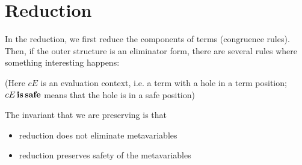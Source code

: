\documentclass[acmsmall,natbib=false,review,anonymous]{acmart}
\begin{document}
    \ottdefnWfInertLabeled{}
\newpage

\section{Reduction}
  
  In the reduction, we first reduce the
  components of terms (congruence rules).
  Then, if the outer structure is an eliminator form,
  there are several rules where something interesting happens:
  \begin{ottdefnblock}[#2]{\ottdefnHeaderRedRed}{}
    \ottusedrule{\ottdruleRedRedAppLamLabeled[#1]{}}
    \ottusedrule{\ottdruleRedRedAppPLamLabeled[#1]{}}
    \ottusedrule{\ottdruleRedRedLRedSafeLabeled[#1]{}}
    \ottusedrule{\ottdruleRedRedLRedNeutLabeled[#1]{}}
    \ottusedrule{\ottdruleRedRedLRedGrLabeled[#1]{}}
    \ottusedrule{\ottdruleRedRedLNotinLabeled[#1]{}}
  \end{ottdefnblock}
  (Here $cE$ is an evaluation context, i.e. a term with a hole 
  in a term position; $cE \, \mathbf{is} \, \mathbf{safe}$ means that the hole is in a safe position)

  The invariant that we are preserving is that 
  \begin{itemize}
    \item reduction does not eliminate metavariables
    \item reduction preserves safety of the metavariables
  \end{itemize}
\end{document}

